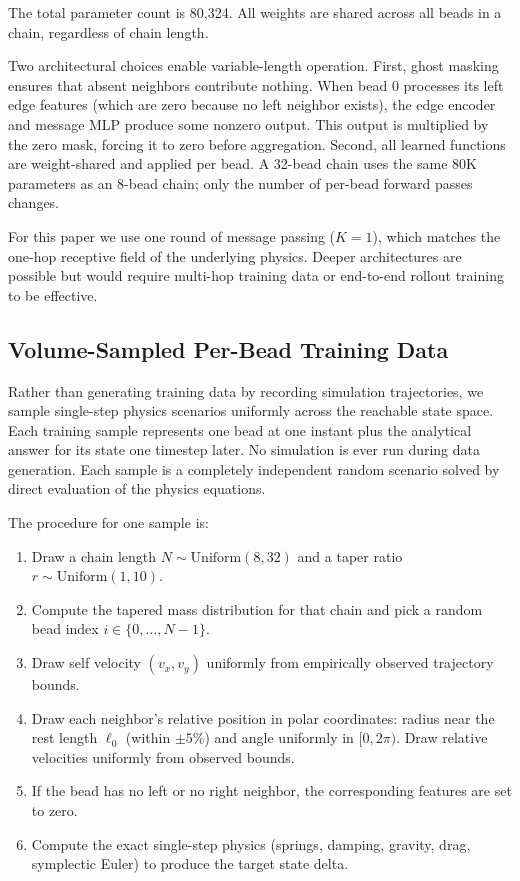 \documentclass[conference]{IEEEtran}
\begin{document}
The total parameter count is 80{,}324. All weights are shared across all beads in a chain, regardless of chain length.

Two architectural choices enable variable-length operation. First, ghost masking ensures that absent neighbors contribute nothing. When bead 0 processes its left edge features (which are zero because no left neighbor exists), the edge encoder and message MLP produce some nonzero output. This output is multiplied by the zero mask, forcing it to zero before aggregation. Second, all learned functions are weight-shared and applied per bead. A 32-bead chain uses the same 80K parameters as an 8-bead chain; only the number of per-bead forward passes changes.

For this paper we use one round of message passing ($K=1$), which matches the one-hop receptive field of the underlying physics. Deeper architectures are possible but would require multi-hop training data or end-to-end rollout training to be effective.

\subsection{Volume-Sampled Per-Bead Training Data}

Rather than generating training data by recording simulation trajectories, we sample single-step physics scenarios uniformly across the reachable state space. Each training sample represents one bead at one instant plus the analytical answer for its state one timestep later. No simulation is ever run during data generation. Each sample is a completely independent random scenario solved by direct evaluation of the physics equations.

The procedure for one sample is:
\begin{enumerate}
    \item Draw a chain length $N \sim \text{Uniform}(8, 32)$ and a taper ratio $r \sim \text{Uniform}(1, 10)$.
    \item Compute the tapered mass distribution for that chain and pick a random bead index $i \in \{0, \ldots, N-1\}$.
    \item Draw self velocity $(v_x, v_y)$ uniformly from empirically observed trajectory bounds.
    \item Draw each neighbor's relative position in polar coordinates: radius near the rest length $\ell_0$ (within $\pm 5\%$) and angle uniformly in $[0, 2\pi)$. Draw relative velocities uniformly from observed bounds.
    \item If the bead has no left or no right neighbor, the corresponding features are set to zero.
    \item Compute the exact single-step physics (springs, damping, gravity, drag, symplectic Euler) to produce the target state delta.
\end{enumerate}
\end{document}
